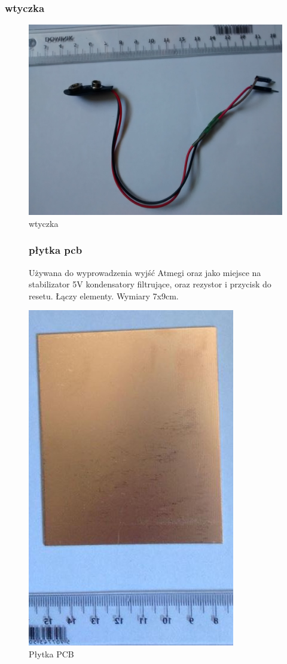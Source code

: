 \documentclass[a4paper,11pt]{article}
\def\SCALE{0.6}
\begin{document}
\subsubsection{wtyczka}
\begin{figure}[H]
	\centering
	\includegraphics[width=\SCALE
	\paperwidth]{zlaczka}
	\caption{wtyczka}
\end{figure}


\begin{figure}[H]

	\subsubsection{płytka pcb}
	Używana do wyprowadzenia wyjść Atmegi oraz jako miejsce na stabilizator 5V kondensatory filtrujące,	oraz rezystor i przycisk do resetu. Łączy elementy. Wymiary 7x9cm.

	\centering
	\includegraphics[width=\SCALE
	\paperwidth]{plytka}
	\caption{Płytka PCB}
\end{figure}
\end{document}
